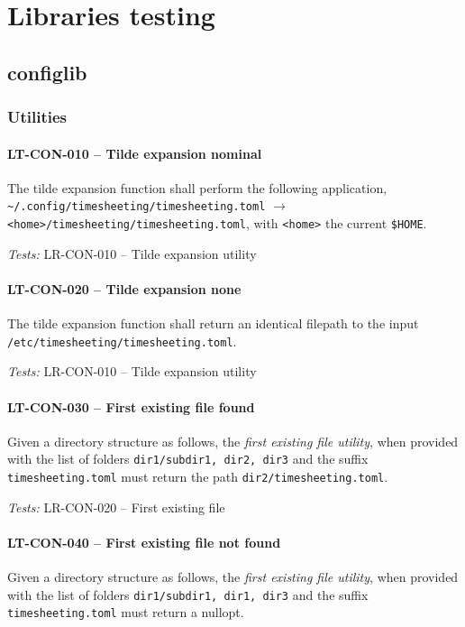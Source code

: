 \section{Libraries testing}
\subsection{config\textunderscore lib}
\subsubsection{Utilities}
\paragraph{LT-CON-010 -- Tilde expansion nominal}
The tilde expansion function shall perform the following application,
\lstinline{~/.config/timesheeting/timesheeting.toml}
$\rightarrow$ \lstinline{<home>/timesheeting/timesheeting.toml},
with \lstinline{<home>} the current \lstinline{$HOME}.

\textit{Tests: } LR-CON-010 -- Tilde expansion utility

\paragraph{LT-CON-020 -- Tilde expansion none}
The tilde expansion function shall return an identical filepath to the
input \lstinline{/etc/timesheeting/timesheeting.toml}.

\textit{Tests: } LR-CON-010 -- Tilde expansion utility

\paragraph{LT-CON-030 -- First existing file found}
Given a directory structure as follows,
the \emph{first existing file utility}, when provided with the list of folders
\lstinline{dir1/subdir1, dir2, dir3} and the suffix
\lstinline{timesheeting.toml}
must return the path \lstinline{dir2/timesheeting.toml}.

\textit{Tests: } LR-CON-020 -- First existing file

\paragraph{LT-CON-040 -- First existing file not found}
Given a directory structure as follows,
the \emph{first existing file utility}, when provided with the list of folders
\lstinline{dir1/subdir1, dir1, dir3} and the suffix
\lstinline{timesheeting.toml} must return a nullopt.

